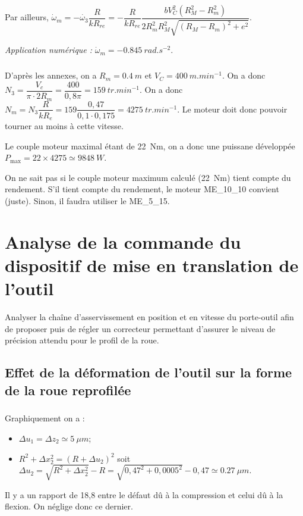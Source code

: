 \documentclass[10pt,fleqn]{article} %
\begin{document}
Par ailleurs, $\dot{\omega}_m = -\dot{\omega_3} \dfrac{R}{ kR_{re}} =- \dfrac{R}{ kR_{re}}  \dfrac{b V_C^2\left(  R_M^2 - R_m^2 \right)}{2R_m^2R_M^2\sqrt{\left(R_M-R_m \right)^2+e^2}} $. 


\textit{Application numérique : } $\dot{\omega}_ m = -\SI{0.845}{rad.s^{-2}}$.

\subparagraph{} %

D'après les annexes, on a $R_m=\SI{0,4}{m}$ et $V_C=\SI{400}{m.min^{-1}}$. On a donc $N_3=\dfrac{V_c}{\pi \cdot 2 R_m} = \dfrac{400}{0,8\pi} = \SI{159}{tr.min^{-1}}$. On a donc $N_m = N_3 \dfrac{R}{kR_e}=159 \dfrac{0,47}{0,1\cdot 0,175} = \SI{4275}{tr.min^{-1}}$. Le moteur doit donc pouvoir tourner au moins à cette vitesse.

Le couple moteur maximal étant de \SI{22}{Nm}, on a donc une puissane développée $P_{\text{max}}=22\times 4275 \simeq \SI{9848}{W}$.

On ne sait pas si le couple moteur maximum calculé (\SI{22}{Nm}) tient compte du rendement. 
S'il tient compte du rendement, le moteur ME\_10\_10 convient (juste). Sinon, il faudra utiliser le ME\_5\_15. 

\section{Analyse de la commande du dispositif de mise en translation de l’outil}
\begin{obj}
Analyser la chaîne d’asservissement en position et en vitesse du porte-outil afin de proposer puis de régler un correcteur permettant d’assurer le niveau de précision attendu pour le profil de la roue.
\end{obj}

\subsection{Effet de la déformation de l’outil sur la forme de la roue reprofilée}

\subparagraph{} %

Graphiquement on a :
\begin{itemize}
\item $\Delta u_1 = \Delta z_2 \simeq \SI{5}{\mu m}$;
\item $R^2 + \Delta x_2^2 = \left(R + \Delta u_2\right)^2$ soit $\Delta u_2 = \sqrt{R^2 + \Delta x_2^2} - R = \sqrt{0,47^2 + 0,0005^2} - 0,47 \simeq \SI{0,27}{\mu m}$.%
\end{itemize}
Il y a un rapport de 18,8 entre le défaut dû à la compression et celui dû à la flexion. On néglige donc ce dernier. 
 
\end{document}

